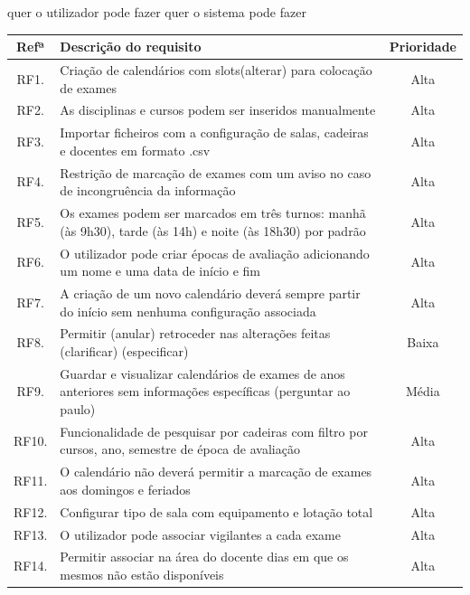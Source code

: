 \documentclass[11pt, twoside]{report}
\begin{document}
	quer o utilizador pode fazer quer o sistema pode fazer
\begin{table}
	
	\begin{center}
		
				\begin{tabularx}{\textwidth}{|c|X|c|}
				\hline
				\textbf{Refª }	& \textbf{Descrição do requisito} & \textbf{Prioridade} \\
				\hline
				RF1. & Criação de calendários com slots(alterar) para colocação de exames & Alta \\
				\hline
				RF2. & As disciplinas e cursos podem ser inseridos manualmente & Alta\\
				\hline
				RF3. & Importar ficheiros com a configuração de salas, cadeiras e docentes em formato .csv & Alta \\
				\hline
				RF4. &  Restrição de marcação de exames com um aviso no caso de incongruência da informação & Alta \\
				\hline
				RF5. & Os exames podem ser marcados em três turnos: manhã (às 9h30), tarde (às 14h) e noite (às 18h30) por padrão & Alta \\
				\hline
				RF6. & O utilizador pode criar épocas de avaliação adicionando um nome e uma data de início e fim & Alta \\
				\hline
				RF7. & A criação de um novo calendário deverá sempre partir do início sem nenhuma configuração associada & Alta\\
				\hline
				RF8. & Permitir (anular) retroceder nas alterações feitas (clarificar) (especificar) & Baixa \\
				\hline
				RF9. & Guardar e visualizar calendários de exames de anos anteriores sem informações específicas (perguntar ao paulo) & Média \\
				\hline
				RF10.  & Funcionalidade de pesquisar por cadeiras com filtro por cursos, ano, semestre de época de avaliação  & Alta \\
				\hline
				RF11. & O calendário não deverá permitir a marcação de exames aos domingos e feriados & Alta \\
				\hline
				RF12. & Configurar tipo de sala com equipamento e lotação total & Alta \\
				\hline
				RF13. & O utilizador pode associar vigilantes a cada exame & Alta \\
				\hline
				RF14. & Permitir associar na área do docente dias em que os mesmos não estão disponíveis & Alta\\

\end{tabularx}
\end{center}
\end{table}
\end{document}
